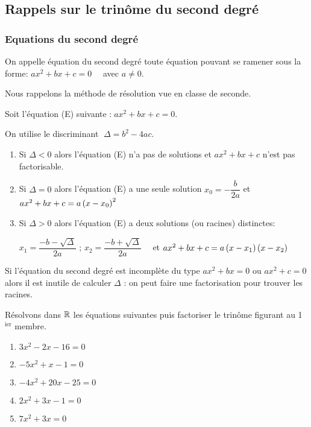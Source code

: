 


  
  \subsection{Rappels sur le trinôme du second degré}
\subsubsection*{Equations du second degré }
\begin{definition} 
 On appelle équation du second degré toute équation pouvant se ramener sous la forme: $ ax^{2}+bx+c=0  \quad $ avec  $ a\neq0 $.
\end{definition}

Nous  rappelons la méthode de résolution vue en classe de  seconde.

Soit l'équation (E) suivante :$ \; ax^{2}+bx+c=0$.

On utilise le discriminant $\; \Delta=b^{2}-4ac $.

\begin{enumerate}
\item Si $ \Delta < 0 $ alors l'équation (E) n'a  pas de  solutions et  $ ax^{2}+bx+c $ n'est pas factorisable.
   \item Si $ \Delta = 0 $ alors l'équation (E) a  une seule  solution $x_{0}=-\dfrac{b}{2a}$    et   $ ax^{2}+bx+c= a\left(x-x_{0}\right)^{2}$ 
\item Si $ \Delta > 0 $ alors l'équation (E) a deux solutions (ou racines) distinctes:


$ x_{1}=\dfrac{-b-\sqrt{\Delta}}{2a}$  ;  $x_{2}=\dfrac{-b+\sqrt{\Delta}}{2a}\quad$ et  $ ax^{2}+bx+c= a\left(x-x_{1}\right)\left(x-x_{2}\right)$ 
\end{enumerate}


\begin{remark}

 Si l'équation du  second degré est incomplète du type  $ax^{2}+bx=0 $  ou    $ ax^{2}+c=0$ alors il est inutile de calculer $ \Delta $ : on peut faire une factorisation pour trouver les racines.
\end{remark}

\begin{example}

Résolvons dans $ \mathbb{R} $  les équations suivantes puis factoriser le trinôme figurant au 1$ ^{\text{ier}} $ membre.

\begin{enumerate}
\item $ 3x^{2}-2x-16=0 $
 \item $ -5x^{2}+x-1=0 $
 \item $ -4x^{2}+20x-25=0 $
   \item $ 2x^{2}+3x-1=0 $
    \item $ 7x^{2}+3x=0 $
\end{enumerate}

 \end{example}
 

